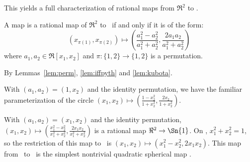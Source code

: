 \noindent This yields 
a full characterization of rational maps from $\Re^2$ to .
%
\begin{theorem}
\label{thm:n2}
A map is a rational map of $\Re^2$ to \ if and only if 
it is of the form:
\begin{equation}
\label{eq:rationaltoS1}
	(x_{\pi(1)},x_{\pi(2)}) \mapsto (\frac{a_1^2 - a_2^2}{a_1^2 + a_2^2}, 
			   \frac{2a_1 a_2}{a_1^2 + a_2^2})
\end{equation}
where $a_1,a_2 \in \Re[x_1,x_2]$ and $\pi : \{1,2\} \rightarrow \{1,2\}$
is a permutation.
\end{theorem}
\prf
By Lemmas~\ref{lem:perm}, \ref{lem:iffpyth} and \ref{lem:kubota}.
\QED


\begin{example}
With $(a_1,a_2) = (1,x_2)$ and the identity permutation,
we have the familiar parameterization of the circle
$(x_1,x_2) \mapsto (\frac{1 - x_2^2}{1 + x_2^2}, 
				 \frac{2x_2}{1 + x_2^2})$.
\end{example}

\begin{example}
With $(a_1,a_2) = (x_1,x_2)$ and the identity permutation,
$(x_1,x_2) \mapsto (\frac{x_1^2 - x_2^2}{x_1^2 + x_2^2}, 
				 \frac{2x_1 x_2}{x_1^2 + x_2^2})$
is a rational map $\Re^2 \rightarrow \Sn{1}$.
On , $x_1^2 + x_2^2 = 1$, so the restriction of this map
to \ is $(x_1,x_2) \mapsto (x_1^2 - x_2^2, 2x_1x_2)$.
This map from \ to \ is
the simplest nontrivial quadratic spherical map \cite{ono94}. %
\end{example}

